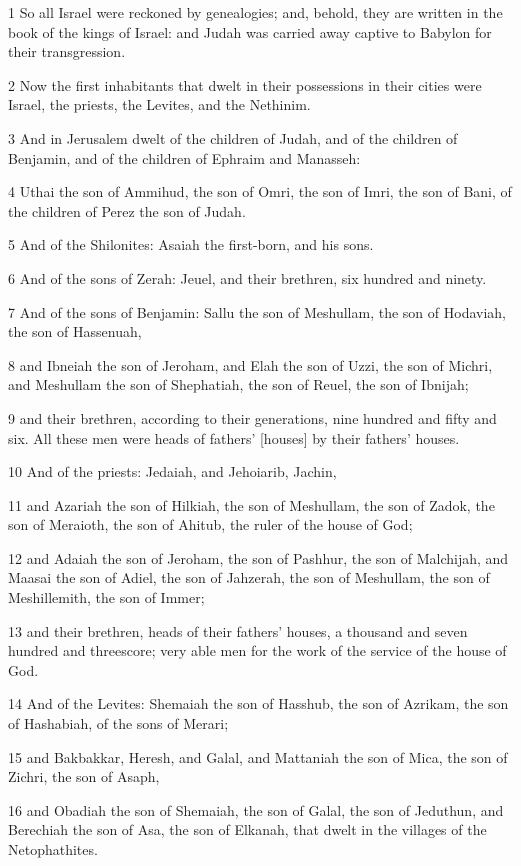 \par 1 So all Israel were reckoned by genealogies; and, behold, they are written in the book of the kings of Israel: and Judah was carried away captive to Babylon for their transgression.
\par 2 Now the first inhabitants that dwelt in their possessions in their cities were Israel, the priests, the Levites, and the Nethinim.
\par 3 And in Jerusalem dwelt of the children of Judah, and of the children of Benjamin, and of the children of Ephraim and Manasseh:
\par 4 Uthai the son of Ammihud, the son of Omri, the son of Imri, the son of Bani, of the children of Perez the son of Judah.
\par 5 And of the Shilonites: Asaiah the first-born, and his sons.
\par 6 And of the sons of Zerah: Jeuel, and their brethren, six hundred and ninety.
\par 7 And of the sons of Benjamin: Sallu the son of Meshullam, the son of Hodaviah, the son of Hassenuah,
\par 8 and Ibneiah the son of Jeroham, and Elah the son of Uzzi, the son of Michri, and Meshullam the son of Shephatiah, the son of Reuel, the son of Ibnijah;
\par 9 and their brethren, according to their generations, nine hundred and fifty and six. All these men were heads of fathers' [houses] by their fathers' houses.
\par 10 And of the priests: Jedaiah, and Jehoiarib, Jachin,
\par 11 and Azariah the son of Hilkiah, the son of Meshullam, the son of Zadok, the son of Meraioth, the son of Ahitub, the ruler of the house of God;
\par 12 and Adaiah the son of Jeroham, the son of Pashhur, the son of Malchijah, and Maasai the son of Adiel, the son of Jahzerah, the son of Meshullam, the son of Meshillemith, the son of Immer;
\par 13 and their brethren, heads of their fathers' houses, a thousand and seven hundred and threescore; very able men for the work of the service of the house of God.
\par 14 And of the Levites: Shemaiah the son of Hasshub, the son of Azrikam, the son of Hashabiah, of the sons of Merari;
\par 15 and Bakbakkar, Heresh, and Galal, and Mattaniah the son of Mica, the son of Zichri, the son of Asaph,
\par 16 and Obadiah the son of Shemaiah, the son of Galal, the son of Jeduthun, and Berechiah the son of Asa, the son of Elkanah, that dwelt in the villages of the Netophathites.
